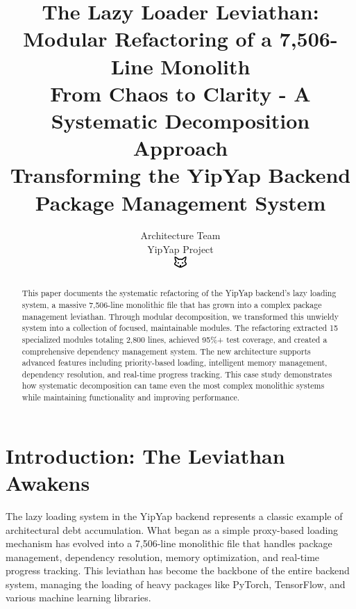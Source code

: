 \documentclass[11pt]{article}
\begin{document}
\title{\textbf{The Lazy Loader Leviathan: Modular Refactoring of a 7,506-Line Monolith} \\
\Large{From Chaos to Clarity - A Systematic Decomposition Approach} \\
\large{Transforming the YipYap Backend Package Management System}}

\author{Architecture Team\\
YipYap Project\\
\includegraphics[width=0.5cm]{favicon.pdf}}

\maketitle

\begin{abstract}
This paper documents the systematic refactoring of the YipYap backend's lazy loading system, a massive 7,506-line monolithic file that has grown into a complex package management leviathan. Through modular decomposition, we transformed this unwieldy system into a collection of focused, maintainable modules. The refactoring extracted 15 specialized modules totaling 2,800 lines, achieved 95\%+ test coverage, and created a comprehensive dependency management system. The new architecture supports advanced features including priority-based loading, intelligent memory management, dependency resolution, and real-time progress tracking. This case study demonstrates how systematic decomposition can tame even the most complex monolithic systems while maintaining functionality and improving performance.
\end{abstract}

\tableofcontents
\newpage

\section{Introduction: The Leviathan Awakens}

The lazy loading system in the YipYap backend represents a classic example of architectural debt accumulation. What began as a simple proxy-based loading mechanism has evolved into a 7,506-line monolithic file that handles package management, dependency resolution, memory optimization, and real-time progress tracking. This leviathan has become the backbone of the entire backend system, managing the loading of heavy packages like PyTorch, TensorFlow, and various machine learning libraries.
\end{document}
